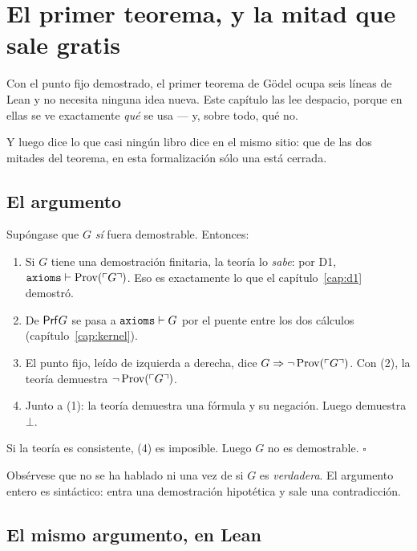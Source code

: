 \chapter{El primer teorema, y la mitad que sale gratis}
\label{cap:godel-i}

Con el punto fijo demostrado, el primer teorema de Gödel ocupa seis líneas de Lean y no necesita
ninguna idea nueva. Este capítulo las lee despacio, porque en ellas se ve exactamente
\emph{qué} se usa — y, sobre todo, qué no.

Y luego dice lo que casi ningún libro dice en el mismo sitio: que de las dos mitades del teorema,
en esta formalización sólo una está cerrada.

\section{El argumento}

Supóngase que $G$ \emph{sí} fuera demostrable. Entonces:

\begin{matematica}
\begin{enumerate}
\item Si $G$ tiene una demostración finitaria, la teoría lo \emph{sabe}: por D1,
  $\text{\ident{axioms}} \derives \Prov(\codigo{G})$. Eso es exactamente lo que el
  capítulo~\ref{cap:d1} demostró.
\item De $\mathsf{Prf} G$ se pasa a $\text{\ident{axioms}} \derives G$ por el puente entre los dos cálculos
  (capítulo~\ref{cap:kernel}).
\item El punto fijo, leído de izquierda a derecha, dice
  $G \Rightarrow \lnot\operatorname{Prov}(\ulcorner G \urcorner)$. Con (2), la teoría demuestra
  $\lnot\operatorname{Prov}(\ulcorner G \urcorner)$.
\item Junto a (1): la teoría demuestra una fórmula y su negación. Luego demuestra $\bot$.
\end{enumerate}
Si la teoría es consistente, (4) es imposible. Luego $G$ no es demostrable. $\square$
\end{matematica}

Obsérvese que no se ha hablado ni una vez de si $G$ es \emph{verdadera}. El argumento entero es
sintáctico: entra una demostración hipotética y sale una contradicción.

\section{El mismo argumento, en Lean}

